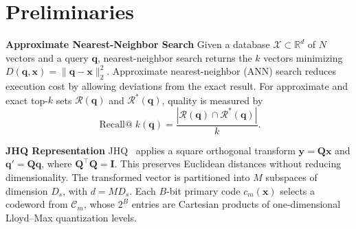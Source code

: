 \section{Preliminaries}
\label{sec:preli}






\textbf{Approximate Nearest-Neighbor Search}
Given a database $\mathcal{X}\subset\mathbb{R}^{d}$ of $N$ vectors and a query $\mathbf{q}$, nearest-neighbor search returns the $k$ vectors minimizing $D(\mathbf{q},\mathbf{x})=\|\mathbf{q}-\mathbf{x}\|_2^2$. Approximate nearest-neighbor (ANN) search reduces execution cost by allowing deviations from the exact result. For approximate and exact top-$k$ sets $\mathcal{R}(\mathbf{q})$ and $\mathcal{R}^{*}(\mathbf{q})$, quality is measured by
\begin{equation}
\operatorname{Recall@}k(\mathbf{q})=\frac{|\mathcal{R}(\mathbf{q})\cap\mathcal{R}^{*}(\mathbf{q})|}{k}.
\end{equation}

\textbf{JHQ Representation}
JHQ~\cite{jhq} applies a square orthogonal transform $\mathbf{y}=\mathbf{Q}\mathbf{x}$ and $\mathbf{q}'=\mathbf{Q}\mathbf{q}$, where $\mathbf{Q}^{\top}\mathbf{Q}=\mathbf{I}$. This preserves Euclidean distances without reducing dimensionality. The transformed vector is partitioned into $M$ subspaces of dimension $D_s$, with $d=MD_s$. Each $B$-bit primary code $c_m(\mathbf{x})$ selects a codeword from $\mathcal{C}_m$, whose $2^B$ entries are Cartesian products of one-dimensional Lloyd--Max quantization levels.

